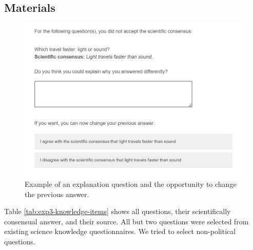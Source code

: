 \documentclass[
  doc,floatsintext]{apa6}
\begin{document}
\subsection{Materials}\label{materials-4}

\FloatBarrier



\begin{figure}

{\centering \includegraphics[width=0.5\linewidth]{figures/study3_example_explanation} 

}

\caption{Example of an explanation question and the opportunity to change the previous answer.}\label{fig:exp3-explanation-example}
\end{figure}

Table \ref{tab:exp3-knowledge-items} shows all questions, their scientifically consensual answer, and their source. All but two questions were selected from existing science knowledge questionnaires. We tried to select non-political questions.

\begingroup\fontsize{8}{10}\selectfont
\end{document}
